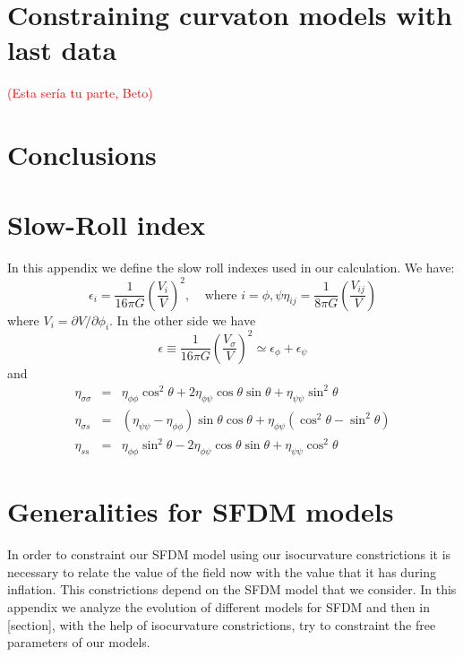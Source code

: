 \documentclass[amssymb,twocolumn,prd,nofootinbib,showpacs]{revtex4-1}
\begin{document}
\section{Constraining curvaton models with last data}
\textcolor{red}{(Esta ser\'ia tu parte, Beto)}
\section{Conclusions}
\appendix
\section{Slow-Roll index}

In this appendix we define the slow roll indexes used in our calculation. We have:
\begin{subequations}
\begin{equation}
\epsilon_i = \frac{1}{16 \pi G}\left(\frac{V_i}{V}\right)^2, \ \ \ \ \ \text{where $i=\phi,\psi$}
\end{equation}
\begin{equation}
\eta_{ij}=\frac{1}{8\pi G}\left(\frac{V_{ij}}{V}\right)
\end{equation}
\end{subequations}
where $V_i = \partial V/\partial \phi_i$. In the other side we have
\begin{equation}
\epsilon \equiv \frac{1}{16\pi G}\left(\frac{V_\sigma}{V}\right)^2\simeq \epsilon_\phi+\epsilon_\psi
\end{equation}
and
\begin{eqnarray}
\eta_{\sigma\sigma}&=&\eta_{\phi\phi}\cos^2\theta + 2\eta_{\phi\psi}\cos\theta\sin\theta+\eta_{\psi\psi}\sin^2\theta\nonumber \\
\eta_{\sigma s}&=&(\eta_{\psi\psi}-\eta_{\phi\phi})\sin\theta\cos\theta + \eta_{\phi\psi}(\cos^2\theta-\sin^2\theta)\\
\eta_{ss}&=&\eta_{\phi\phi}\sin^2\theta - 2\eta_{\phi\psi}\cos\theta\sin\theta+\eta_{\psi\psi}\cos^2\theta\nonumber 
\end{eqnarray}
\section{Generalities for SFDM models}

In order to constraint our SFDM model using our isocurvature constrictions it is necessary to relate the value of the field now with the value that it has during inflation. This constrictions depend on the SFDM model that we consider. In this appendix we analyze the evolution of different models for SFDM and then in [section], with the help of isocurvature constrictions, try to constraint the free parameters of our models. 
\end{document}
